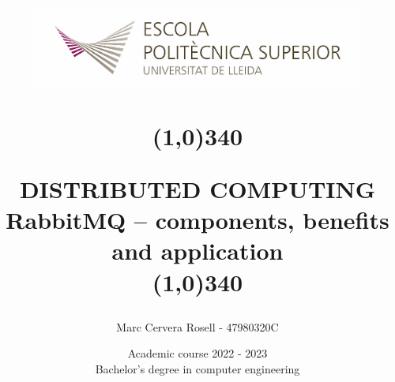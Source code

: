 \title{
	\begin{center}
	\vspace{3cm}
	\includegraphics[width=11cm, height=3cm]{Images/Logo-nou-eps.jpg}
	\end{center}
	\begin{center}
	\line(1,0){340}
	\end{center}		
	DISTRIBUTED COMPUTING\\
	\vspace{2mm}
	\Large RabbitMQ – components, benefits and application \\
	\line(1,0){340}
	\vspace{2.5cm}
	}

\author{Marc Cervera Rosell - 47980320C \vspace{1cm}}


\date{Academic course 2022 - 2023\vspace{0.5cm} \\Bachelor's degree in computer engineering}